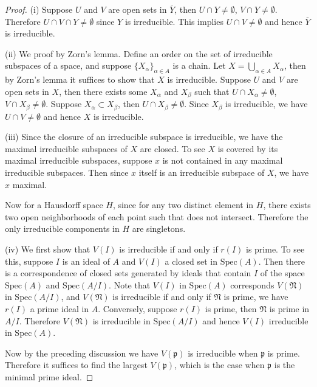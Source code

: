 \begin{proof}
(i) Suppose $U$ and $V$ are open sets in $\overline{Y}$, then $U\cap Y\ne\emptyset$, $V\cap Y\ne\emptyset$. Therefore $U\cap V\cap Y\ne\emptyset$ since $Y$ is irreducible. This implies $U\cap V\ne\emptyset$ and hence $\overline{Y}$ is irreducible.\par
(ii) We proof by Zorn's lemma. Define an order on the set of irreducible subspaces of a space, and suppose $\{X_{\alpha}\}_{\alpha\in A}$ is a chain.  Let $X=\bigcup_{\alpha\in A}X_\alpha$, then by Zorn's lemma it suffices to show that $X$ is irreducible. Suppose $U$ and $V$ are open sets in $X$, then there exists some $X_\alpha$ and $X_\beta$ such that $U\cap X_\alpha\ne\emptyset$, $V\cap X_\beta\ne\emptyset$. Suppose $X_\alpha\subset X_\beta$, then $U\cap X_\beta\ne\emptyset$. Since $X_\beta$ is irreducible, we have $U\cap V\ne\emptyset$ and hence $X$ is irreducible.\par
(iii) Since the closure of an irreducible subspace is irreducible, we have the maximal irreducible subspaces of $X$ are closed. To see $X$ is covered by its maximal irreducible subspaces, suppose $x$ is not contained in any maximal irreducible subspaces. Then since $x$ itself is an irreducible subspace of $X$, we have $x$ maximal.\par
Now for a Hausdorff space $H$, since for any two distinct element in $H$, there exists two open neighborhoods of each point such that does not intersect. Therefore the only irreducible components in $H$ are singletons.\par
(iv) We first show that $V(I)$ is irreducible if and only if $r(I)$ is prime. To see this, suppose $I$ is an ideal of $A$ and $V(I)$ a closed set in $\mathrm{Spec}(A)$. Then there is a correspondence of closed sets generated by ideals that contain $I$ of the space $\mathrm{Spec}(A)$ and $\mathrm{Spec}(A/I)$. Note that $V(I)$ in $\mathrm{Spec}(A)$ corresponds $V(\mathfrak{N})$ in $\mathrm{Spec}(A/I)$, and $V(\mathfrak{N})$ is irreducible if and only if $\mathfrak{N}$ is prime, we have $r(I)$ a prime ideal in $A$. Conversely, suppose $r(I)$ is prime, then $\mathfrak{N}$ is prime in $A/I$. Therefore $V(\mathfrak{N})$ is irreducible in $\mathrm{Spec}(A/I)$ and hence $V(I)$ irreducible in $\mathrm{Spec}(A)$.\par
Now by the preceding discussion we have $V(\mathfrak{p})$ is irreducible when $\mathfrak{p}$ is prime. Therefore it suffices to find the largest $V(\mathfrak{p})$, which is the case when $\mathfrak{p}$ is the minimal prime ideal.
\end{proof}
